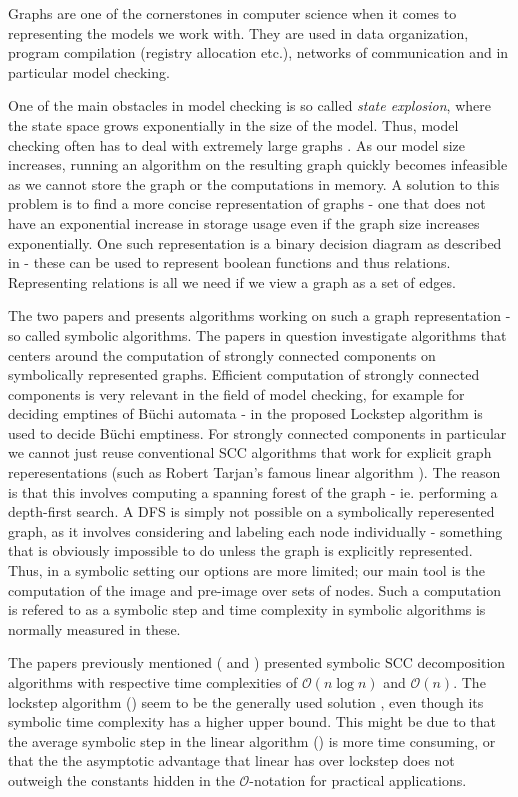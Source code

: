 \documentclass[../master/master.tex]{subfiles}
\begin{document}
Graphs are one of the cornerstones in computer science when it comes to representing the models we work with. They are used in data organization,  program compilation (registry allocation etc.), networks of communication and in particular model checking.

One of the main obstacles in model checking is so called \textit{state explosion}, where the state space grows exponentially in the size of the model. Thus, model checking often has to deal with extremely large graphs \cite{pelanek_2004}. As our model size increases, running an algorithm on the resulting graph quickly becomes infeasible as we cannot store the graph or the computations in memory. A solution to this problem is to find a more concise representation of graphs - one that does not have an exponential increase in storage usage even if the graph size increases exponentially. One such representation is a binary decision diagram as described in \cite{bryant_1992} - these can be used to represent boolean functions and thus relations. Representing relations is all we need if we view a graph as a set of edges.

The two papers \cite{linear} and \cite{lockstep} presents algorithms working on such a graph representation - so called symbolic algorithms. The papers in question investigate algorithms that centers around the computation of strongly connected components on symbolically represented graphs. Efficient computation of strongly connected components is very relevant in the field of model checking, for example for deciding emptines of Büchi automata - in \cite{lockstep} the proposed Lockstep algorithm is used to decide Büchi emptiness.  For strongly connected components in particular we cannot just reuse conventional SCC algorithms that work for explicit graph reperesentations (such as Robert Tarjan's famous linear algorithm \cite{tarjan_1971}). The reason is that this involves computing a spanning forest of the graph - ie. performing a depth-first search. A DFS is simply not possible on a symbolically reperesented graph, as it involves considering and labeling each node individually - something that is obviously impossible to do unless the graph is explicitly represented. Thus, in a symbolic setting our options are more limited; our main tool is the computation of the image and pre-image over sets of nodes. Such a computation is refered to as a symbolic step and time complexity in symbolic algorithms is normally measured in these.

The papers previously mentioned (\cite{linear} and \cite{lockstep}) presented symbolic SCC decomposition algorithms with respective time complexities of $\mathcal{O}(n \log n)$ and $\mathcal{O}(n)$. The lockstep algorithm (\cite{lockstep}) seem to be the generally used solution , even though its symbolic time complexity has a higher upper bound. This might be due to that the average symbolic step in the linear algorithm (\cite{linear}) is more time consuming, or that the the asymptotic advantage that linear has over lockstep does not outweigh the constants hidden in the $\mathcal{O} $-notation for practical applications.
\end{document}
